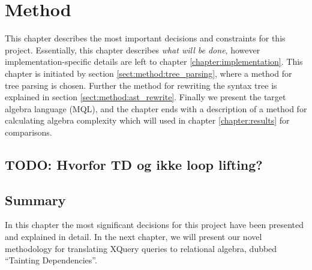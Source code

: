 \chapter{Method}
\label{chapter:method}
This chapter describes the most important decisions and constraints for this
project. Essentially, this chapter describes \emph{what will be done}, however
implementation-specific details are left to chapter
\ref{chapter:implementation}. This chapter is initiated by section
\ref{sect:method:tree_parsing}, where a method for tree parsing is chosen.
Further the method for rewriting the syntax tree is explained in section
\ref{sect:method:ast_rewrite}. Finally we present the target algebra language
(MQL), and the chapter ends with a description of a method for calculating
algebra complexity which will used in chapter \ref{chapter:results} for
comparisons.

\section{TODO: Hvorfor TD og ikke loop lifting?}







\section{Summary}
\label{sect:method:summary}
In this chapter the most significant decisions for this project have been
presented and explained in detail. In the next chapter, we will present our
novel methodology for translating XQuery queries to relational algebra, dubbed
``Tainting Dependencies''.
